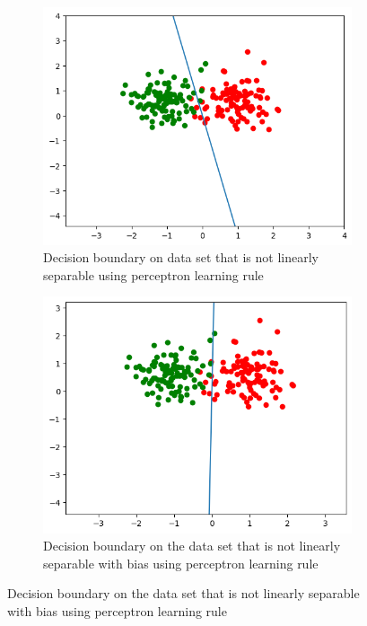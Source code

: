 \documentclass[a4paper]{article}
\begin{document}
\begin{figure}[htb]
    \centering
    \begin{subfigure}{0.4\textwidth}
        \includegraphics[width=\textwidth]{Labs/Lab 1/Lab 1a/Results/perceptron_learning_nonLinear_with_bias.png}
        \caption{Decision boundary on data set that is not linearly separable  using perceptron learning rule}
        \label{fig:Decision-boundary-not-linearly-separable}
    \end{subfigure}
    \hfill
    \begin{subfigure}{0.4\textwidth}
        \includegraphics[width=\textwidth]{Labs/Lab 1/Lab 1a/Results/perceptron_learning_nonLinear.png}
        \caption{Decision boundary on the data set that is not linearly separable with bias using perceptron learning rule}
        \label{fig:Error-convergance}
    \end{subfigure}
\end{figure}
\end{document}
